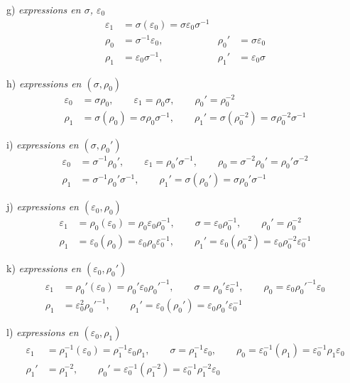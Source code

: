 \documentclass[11pt,a4paper]{article}
\begin{document}
g) \emph{expressions en $\sigma$, $\varepsilon_0$}
\[
\begin{aligned}
\varepsilon_1 &= \sigma(\varepsilon_0) = \sigma \varepsilon_0 \sigma^{-1} \\
\rho_0 &= \sigma^{-1}\varepsilon_0, & \rho_0' &= \sigma \varepsilon_0 \\
\rho_1 &= \varepsilon_0 \sigma^{-1}, & \rho_1' &= \varepsilon_0 \sigma
\end{aligned}
\]

h) \emph{expressions en $(\sigma, \rho_0)$}
\[
\begin{aligned}
\varepsilon_0 &= \sigma \rho_0, \qquad \varepsilon_1 = \rho_0 \sigma, \qquad
\rho_0' = \rho_0^{-2} \\
\rho_1 &= \sigma(\rho_0) = \sigma \rho_0 \sigma^{-1}, \qquad
\rho_1' = \sigma(\rho_0^{-2}) = \sigma \rho_0^{-2} \sigma^{-1}
\end{aligned}
\]

i) \emph{expressions en $(\sigma, \rho_0')$}
\[
\begin{aligned}
\varepsilon_0 &= \sigma^{-1}\rho_0', \qquad \varepsilon_1 = \rho_0' \sigma^{-1}, \qquad
\rho_0 = \sigma^{-2}\rho_0' = \rho_0' \sigma^{-2} \\
\rho_1 &= \sigma^{-1}\rho_0' \sigma^{-1}, \qquad
\rho_1' = \sigma(\rho_0') = \sigma \rho_0' \sigma^{-1}
\end{aligned}
\]

j) \emph{expressions en $(\varepsilon_0, \rho_0)$}
\[
\begin{aligned}
\varepsilon_1 &= \rho_0(\varepsilon_0) = \rho_0 \varepsilon_0 \rho_0^{-1}, \qquad
\sigma = \varepsilon_0 \rho_0^{-1}, \qquad \rho_0' = \rho_0^{-2} \\
\rho_1 &= \varepsilon_0(\rho_0) = \varepsilon_0 \rho_0 \varepsilon_0^{-1}, \qquad
\rho_1' = \varepsilon_0(\rho_0^{-2}) = \varepsilon_0 \rho_0^{-2} \varepsilon_0^{-1}
\end{aligned}
\]

k) \emph{expressions en $(\varepsilon_0, \rho_0')$}
\[
\begin{aligned}
\varepsilon_1 &= \rho_0'(\varepsilon_0) = \rho_0' \varepsilon_0 \rho_0'^{-1}, \qquad
\sigma = \rho_0' \varepsilon_0^{-1}, \qquad
\rho_0 = \varepsilon_0 \rho_0'^{-1} \varepsilon_0 \\
\rho_1 &= \varepsilon_0^2 \rho_0'^{-1}, \qquad
\rho_1' = \varepsilon_0(\rho_0') = \varepsilon_0 \rho_0' \varepsilon_0^{-1}
\end{aligned}
\]

l) \emph{expressions en $(\varepsilon_0, \rho_1)$}
\[
\begin{aligned}
\varepsilon_1 &= \rho_1^{-1}(\varepsilon_0) = \rho_1^{-1} \varepsilon_0 \rho_1, \qquad
\sigma = \rho_1^{-1} \varepsilon_0, \qquad
\rho_0 = \varepsilon_0^{-1}(\rho_1) = \varepsilon_0^{-1} \rho_1 \varepsilon_0 \\
\rho_1' &= \rho_1^{-2}, \qquad
\rho_0' = \varepsilon_0^{-1}(\rho_1^{-2}) = \varepsilon_0^{-1} \rho_1^{-2} \varepsilon_0
\end{aligned}
\]
\end{document}
